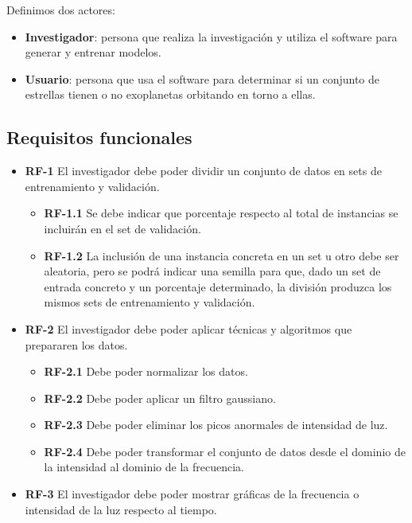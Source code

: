 Definimos dos actores:

\begin{itemize}
    \item \textbf{Investigador}: persona que realiza la investigación y utiliza el software para generar y entrenar modelos.
    \item \textbf{Usuario}: persona que usa el software para determinar si un conjunto de estrellas tienen o no exoplanetas orbitando en torno a ellas.
\end{itemize}

\subsection{Requisitos funcionales}
\begin{itemize}

    \item \textbf{RF-1} El investigador debe poder dividir un conjunto de datos en sets de entrenamiento y validación.
        \begin{itemize}
            \item \textbf{RF-1.1} Se debe indicar que porcentaje respecto al total de instancias se incluirán en el set de validación.
            \item \textbf{RF-1.2} La inclusión de una instancia concreta en un set u otro debe ser aleatoria, pero se podrá indicar una semilla para que, dado un set de entrada concreto y un porcentaje determinado, la división produzca los mismos sets de entrenamiento y validación.            
        \end{itemize}
    
    \item \textbf{RF-2} El investigador debe poder aplicar técnicas y algoritmos que prepararen los datos.
        \begin{itemize}
            \item \textbf{RF-2.1} Debe poder normalizar los datos.
            \item \textbf{RF-2.2} Debe poder aplicar un filtro gaussiano.
            \item \textbf{RF-2.3} Debe poder eliminar los picos anormales de intensidad de luz.
            \item \textbf{RF-2.4} Debe poder transformar el conjunto de datos desde el dominio de la intensidad al dominio de la frecuencia.            
        \end{itemize}

    \item \textbf{RF-3} El investigador debe poder mostrar gráficas de la frecuencia o intensidad de la luz respecto al tiempo.
    

\end{itemize}
